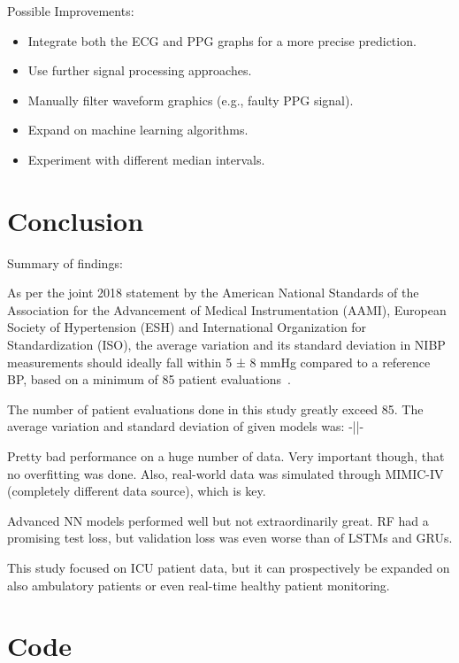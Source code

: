 \documentclass[12pt, bibliography=totoc]{scrartcl}
\begin{document}
    Possible Improvements:
    \begin{itemize}
        \item Integrate both the ECG and PPG graphs for a more precise prediction.
        \item Use further signal processing approaches.
        \item Manually filter waveform graphics (e.g., faulty PPG signal).
        \item Expand on machine learning algorithms.
        \item Experiment with different median intervals.
    \end{itemize}


    \section{Conclusion}
    \label{sec:conclusion}

    Summary of findings:

    As per the joint 2018 statement by the American National Standards of the Association for the Advancement of Medical Instrumentation (AAMI), European Society of Hypertension (ESH)
    and International Organization for Standardization (ISO), the average variation and its standard deviation in NIBP measurements should ideally fall within 5 ± 8 mmHg compared to a reference BP,
    based on a minimum of 85 patient evaluations~\cite{stergiouUniversalStandardValidation2018}.

    The number of patient evaluations done in this study greatly exceed 85.
    The average variation and standard deviation of given models was: -||-

    Pretty bad performance on a huge number of data.
    Very important though, that no overfitting was done.
    Also, real-world data was simulated through MIMIC-IV (completely different data source), which is key.

    Advanced NN models performed well but not extraordinarily great.
    RF had a promising test loss, but validation loss was even worse than of LSTMs and GRUs.

    This study focused on ICU patient data, but it can prospectively be expanded on also ambulatory patients or even real-time healthy patient monitoring.

    \newpage

    \singlespacing
    \small
    
    \normalsize

    \newpage
    \appendix


    \section{Code}\label{sec:code}
    
\end{document}
